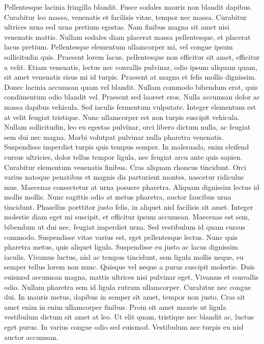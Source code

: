 \documentclass{article}
\begin{document}
Pellentesque lacinia fringilla blandit. Fusce sodales mauris non blandit dapibus. Curabitur leo massa, venenatis et facilisis vitae, tempor nec massa. Curabitur ultrices urna sed urna pretium egestas. Nam finibus magna sit amet nisi venenatis mattis. Nullam sodales diam placerat massa pellentesque, et placerat lacus pretium. Pellentesque elementum ullamcorper mi, vel congue ipsum sollicitudin quis. Praesent lorem lacus, pellentesque non efficitur sit amet, efficitur a velit. Etiam venenatis, lectus nec convallis pulvinar, odio ipsum aliquam quam, sit amet venenatis risus mi id turpis. Praesent at magna et felis mollis dignissim. Donec lacinia accumsan quam vel blandit. Nullam commodo bibendum erat, quis condimentum odio blandit vel. Praesent sed laoreet eros. Nulla accumsan dolor ac massa dapibus vehicula. Sed iaculis fermentum vulputate.
Integer elementum est at velit feugiat tristique. Nunc ullamcorper est non turpis suscipit vehicula. Nullam sollicitudin, leo eu egestas pulvinar, orci libero dictum nulla, ac feugiat sem dui nec magna. Morbi volutpat pulvinar nulla pharetra venenatis. Suspendisse imperdiet turpis quis tempus semper. In malesuada, enim eleifend cursus ultricies, dolor tellus tempor ligula, nec feugiat arcu ante quis sapien. Curabitur elementum venenatis finibus. Cras aliquam rhoncus tincidunt. Orci varius natoque penatibus et magnis dis parturient montes, nascetur ridiculus mus. Maecenas consectetur at urna posuere pharetra. Aliquam dignissim lectus id mollis mollis. Nunc sagittis odio at metus pharetra, auctor faucibus urna tincidunt. Phasellus porttitor justo felis, in aliquet nisl facilisis sit amet. Integer molestie diam eget mi suscipit, et efficitur ipsum accumsan. Maecenas est sem, bibendum ut dui nec, feugiat imperdiet urna.
Sed vestibulum id quam cursus commodo. Suspendisse vitae varius est, eget pellentesque lectus. Nunc quis pharetra metus, quis aliquet ligula. Suspendisse eu justo ac lacus dignissim iaculis. Vivamus luctus, nisl ac tempus tincidunt, sem ligula mollis neque, eu semper tellus lorem non nunc. Quisque vel neque a purus suscipit molestie. Duis euismod accumsan magna, mattis ultrices nisi pulvinar eget. Vivamus et convallis odio. Nullam pharetra sem id ligula rutrum ullamcorper. Curabitur nec congue dui. In mauris metus, dapibus in semper sit amet, tempor non justo. Cras sit amet enim in enim ullamcorper finibus. Proin sit amet mauris ut ligula vestibulum dictum sit amet at leo. Ut elit quam, tristique nec blandit ac, luctus eget purus. In varius congue odio sed euismod. Vestibulum nec turpis eu nisl auctor accumsan.
\end{document}
